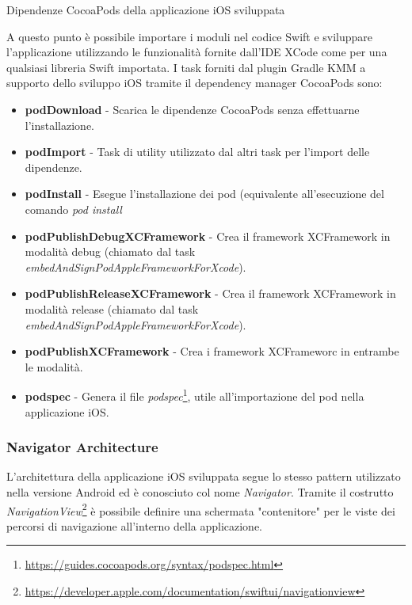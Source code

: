\begin{listing}[H]
    \inputminted{ruby}{code/Podfile}
    \caption{Dipendenze CocoaPods della applicazione iOS sviluppata}
\end{listing}

A questo punto è possibile importare i moduli nel codice Swift e sviluppare l'applicazione utilizzando le funzionalità fornite dall'IDE XCode come per una qualsiasi libreria Swift importata. I task forniti dal plugin Gradle KMM a supporto dello sviluppo iOS tramite il dependency manager CocoaPods sono:

\begin{itemize}
    \item \textbf{podDownload} - Scarica le dipendenze CocoaPods senza effettuarne l'installazione.
    \item \textbf{podImport} - Task di utility utilizzato dal altri task per l'import delle dipendenze.
    \item \textbf{podInstall} - Esegue l'installazione dei pod (equivalente all'esecuzione del comando \textit{pod install}
    \item \textbf{podPublishDebugXCFramework} - Crea il framework XCFramework in modalità debug (chiamato dal task \textit{embedAndSignPodAppleFrameworkForXcode}).
    \item \textbf{podPublishReleaseXCFramework} - Crea il framework XCFramework in modalità release (chiamato dal task \textit{embedAndSignPodAppleFrameworkForXcode}).
    \item \textbf{podPublishXCFramework} - Crea i framework XCFrameworc in entrambe le modalità.
    \item \textbf{podspec} - Genera il file \textit{podspec}\footnote{\href{https://guides.cocoapods.org/syntax/podspec.html}{https://guides.cocoapods.org/syntax/podspec.html}}, utile all'importazione del pod nella applicazione iOS.
\end{itemize}

\subsubsection*{Navigator Architecture}
L'architettura della applicazione iOS sviluppata segue lo stesso pattern utilizzato nella versione Android ed è conosciuto col nome \textit{Navigator}. Tramite il costrutto \textit{NavigationView}\footnote{\href{https://developer.apple.com/documentation/swiftui/navigationview}{https://developer.apple.com/documentation/swiftui/navigationview}} è possibile definire una schermata "contenitore" per le viste dei percorsi di navigazione all'interno della applicazione.

